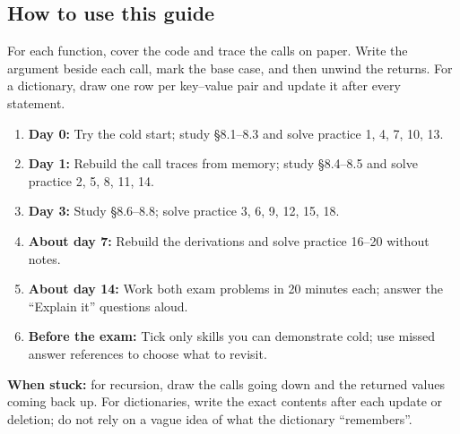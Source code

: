 \documentclass[11pt]{article}
\begin{document}
\begin{keepsection}
\section{How to use this guide}

For each function, cover the code and trace the calls on paper. Write the argument beside each call, mark the base case, and then unwind the returns. For a dictionary, draw one row per key–value pair and update it after every statement.

\begin{enumerate}
\item \textbf{Day 0:} Try the cold start; study §8.1–8.3 and solve practice 1, 4, 7, 10, 13.
\item \textbf{Day 1:} Rebuild the call traces from memory; study §8.4–8.5 and solve practice 2, 5, 8, 11, 14.
\item \textbf{Day 3:} Study §8.6–8.8; solve practice 3, 6, 9, 12, 15, 18.
\item \textbf{About day 7:} Rebuild the derivations and solve practice 16–20 without notes.
\item \textbf{About day 14:} Work both exam problems in 20 minutes each; answer the “Explain it” questions aloud.
\item \textbf{Before the exam:} Tick only skills you can demonstrate cold; use missed answer references to choose what to revisit.
\end{enumerate}

\begin{notebox}\textbf{When stuck:} for recursion, draw the calls going down and the returned values coming back up. For dictionaries, write the exact contents after each update or deletion; do not rely on a vague idea of what the dictionary “remembers”.\end{notebox}
\end{keepsection}
\end{document}
